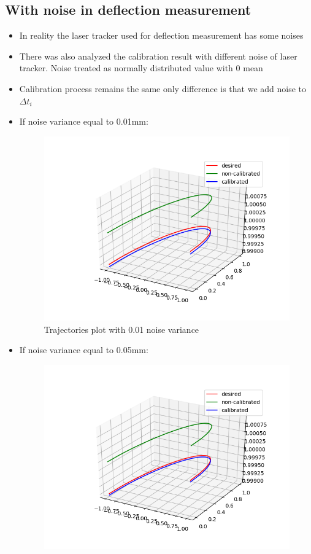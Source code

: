 \documentclass[12pt]{article}
\begin{document}
	\subsection{With noise in deflection measurement}
	\begin{itemize}
		\item In reality the laser tracker used for deflection measurement has some noises
		\item There was also analyzed the calibration result with different noise of laser tracker. Noise treated as normally distributed value with 0 mean
		\item Calibration process remains the same only difference is that we add noise to $\Delta t_i$
		\item If noise variance equal to 0.01mm:
		\begin{figure}[H]
			\centering
			\includegraphics[scale=0.6]{01noise.png}
			\caption{Trajectories plot with 0.01 noise variance}
		\end{figure}
		\item If noise variance equal to 0.05mm:
		\begin{figure}[H]
			\centering
			\includegraphics[scale=0.6]{05noise.png}

\end{figure}
\end{itemize}
\end{document}
